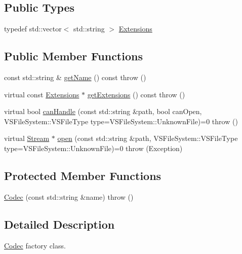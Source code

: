\subsection*{Public Types}
\begin{DoxyCompactItemize}
\item 
typedef std\+::vector$<$ std\+::string $>$ \hyperlink{classAudio_1_1Codec_a2f2e8eb4d85b0e5b338764adfa4bc881}{Extensions}
\end{DoxyCompactItemize}
\subsection*{Public Member Functions}
\begin{DoxyCompactItemize}
\item 
const std\+::string \& \hyperlink{classAudio_1_1Codec_a7ecc8f41ee30126119376f6ca096af23}{get\+Name} () const   throw ()
\item 
virtual const \hyperlink{classAudio_1_1Codec_a2f2e8eb4d85b0e5b338764adfa4bc881}{Extensions} $\ast$ \hyperlink{classAudio_1_1Codec_af898298ac49f9bc82db8f352159014ef}{get\+Extensions} () const   throw ()
\item 
virtual bool \hyperlink{classAudio_1_1Codec_aaae42e87264f1bfa7a75ed041c4432fb}{can\+Handle} (const std\+::string \&path, bool can\+Open, V\+S\+File\+System\+::\+V\+S\+File\+Type type=V\+S\+File\+System\+::\+Unknown\+File)=0  throw ()
\item 
virtual \hyperlink{classAudio_1_1Stream}{Stream} $\ast$ \hyperlink{classAudio_1_1Codec_ace346d58a094f8c467cb152da061f82e}{open} (const std\+::string \&path, V\+S\+File\+System\+::\+V\+S\+File\+Type type=V\+S\+File\+System\+::\+Unknown\+File)=0  throw (\+Exception)
\end{DoxyCompactItemize}
\subsection*{Protected Member Functions}
\begin{DoxyCompactItemize}
\item 
\hyperlink{classAudio_1_1Codec_ae4d9035b22c35be2dcc48a2e6531e9b6}{Codec} (const std\+::string \&name)  throw ()
\end{DoxyCompactItemize}


\subsection{Detailed Description}
\hyperlink{classAudio_1_1Codec}{Codec} factory class.

